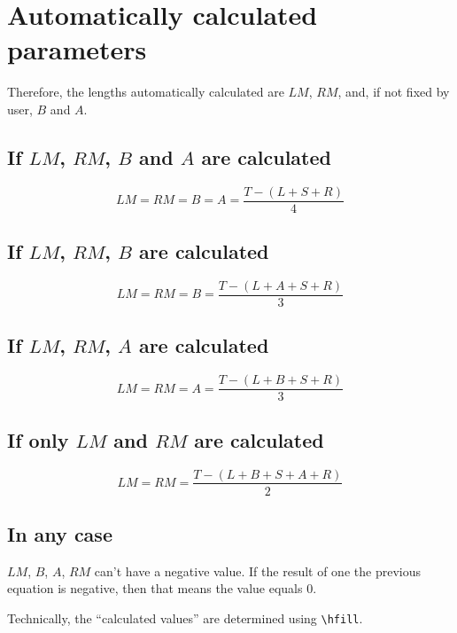 \documentclass[11pt,a4paper]{article}
\begin{document}
\section{Automatically calculated parameters}
Therefore, the lengths automatically calculated are $LM$, $RM$, and, if not fixed by user, $B$ and $A$.


\subsection{If $LM$, $RM$, $B$ and $A$ are calculated}
\begin{equation}
	LM = RM = B = A = \frac{T - (L + S + R)}{4}
\end{equation}

\subsection{If $LM$, $RM$, $B$ are calculated}

\begin{equation}
	LM = RM = B = \frac{T - (L + A + S + R)}{3}
\end{equation}

\subsection{If $LM$, $RM$, $A$ are calculated}

\begin{equation}
	LM = RM = A = \frac{T - (L + B + S + R)}{3}
\end{equation}
\subsection{If only $LM$ and $RM$ are calculated}

\begin{equation}
	LM = RM = \frac{T - (L + B + S + A + R)}{2}
\end{equation}

\subsection{In any case}
$LM$, $B$, $A$, $RM$ can't have a negative value. If the result of one the previous equation is negative, then that means the value equals $0$.

Technically, the \enquote{calculated values} are determined using \verb+\hfill+.
\end{document}

